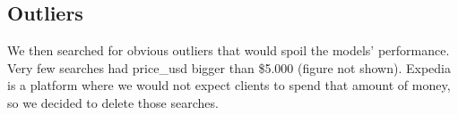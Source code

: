 \documentclass[9pt]{llncs}
\begin{document}


\subsection{Outliers}
We then searched for obvious outliers that would spoil the models’ performance. Very few searches had price\_usd bigger than \$5.000 (figure not shown). Expedia is a platform where we would not expect clients to spend that amount of money, so we decided to delete those searches.
\end{document}
